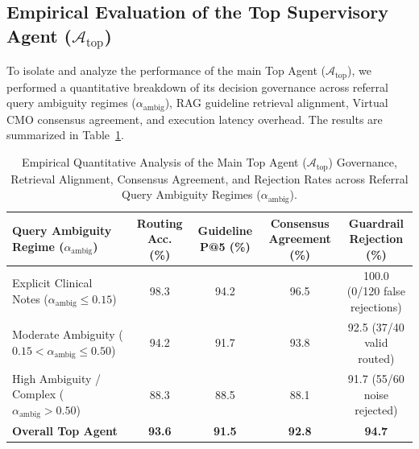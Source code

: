 \documentclass[runningheads]{llncs}
\begin{document}
\subsection{Empirical Evaluation of the Top Supervisory Agent ($\mathcal{A}_{\text{top}}$)}
To isolate and analyze the performance of the main Top Agent ($\mathcal{A}_{\text{top}}$), we performed a quantitative breakdown of its decision governance across referral query ambiguity regimes ($\alpha_{\text{ambig}}$), RAG guideline retrieval alignment, Virtual CMO consensus agreement, and execution latency overhead. The results are summarized in Table~\ref{tab:top_agent_eval}.

\begin{table}[t]
\centering
\caption{Empirical Quantitative Analysis of the Main Top Agent ($\mathcal{A}_{\text{top}}$) Governance, Retrieval Alignment, Consensus Agreement, and Rejection Rates across Referral Query Ambiguity Regimes ($\alpha_{\text{ambig}}$).}
\label{tab:top_agent_eval}
\begin{tabular}{lcccc}
\toprule
\textbf{Query Ambiguity Regime ($\alpha_{\text{ambig}}$)} & \textbf{Routing Acc. (\%)} & \textbf{Guideline P@5 (\%)} & \textbf{Consensus Agreement (\%)} & \textbf{Guardrail Rejection (\%)} \\ \midrule
Explicit Clinical Notes ($\alpha_{\text{ambig}} \le 0.15$) & 98.3 & 94.2 & 96.5 & 100.0 (0/120 false rejections) \\
Moderate Ambiguity ($0.15 < \alpha_{\text{ambig}} \le 0.50$) & 94.2 & 91.7 & 93.8 & 92.5 (37/40 valid routed) \\
High Ambiguity / Complex ($\alpha_{\text{ambig}} > 0.50$) & 88.3 & 88.5 & 88.1 & 91.7 (55/60 noise rejected) \\ \midrule
\textbf{Overall Top Agent} & \textbf{93.6} & \textbf{91.5} & \textbf{92.8} & \textbf{94.7} \\ \bottomrule
\end{tabular}
\end{table}
\end{document}
